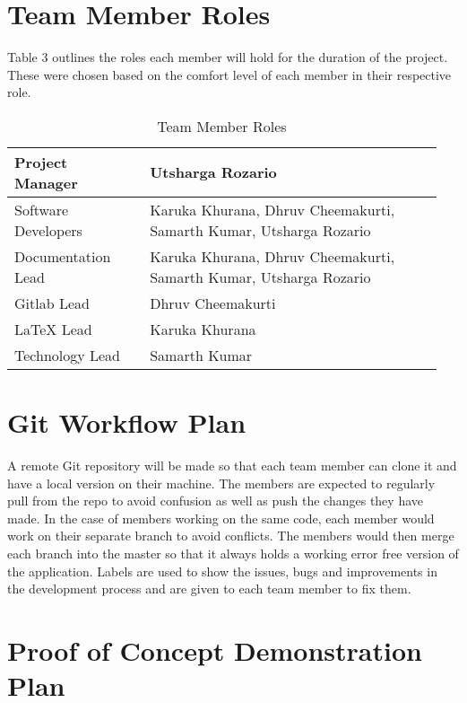 \documentclass[12pt, titlepage]{article}
\begin{document}
\section{Team Member Roles}
Table 3 outlines the roles each member will hold for the duration of the project. These were chosen based on the comfort level of each member in their respective role.  
\begin{table}[ht]
    \centering
    \begin{tabular}{| p{0.3\linewidth} | p{0.65\linewidth} |}
		\hline
Project Manager & Utsharga Rozario \\ \hline
Software Developers & Karuka Khurana, Dhruv Cheemakurti, Samarth Kumar, Utsharga Rozario \\ \hline
Documentation Lead & Karuka Khurana, Dhruv Cheemakurti, Samarth Kumar, Utsharga Rozario \\ \hline
Gitlab Lead & Dhruv Cheemakurti \\ \hline
LaTeX Lead & Karuka Khurana \\ \hline
Technology Lead & Samarth Kumar \\ \hline
    \end{tabular}
    \caption{Team Member Roles}
    \label{tab:my_label}
\end{table}

\newpage
\section{Git Workflow Plan}
A remote Git repository will be made so that each team member can clone it and have a local version on their machine. The members are expected to regularly pull from the repo to avoid confusion as well as push the changes they have made. In the case of members working on the same code, each member would work on their separate branch to avoid conflicts. The members would then merge each branch into the master so that it always holds a working error free version of the application. Labels are used to show the issues, bugs and improvements in the development process and are given to each team member to fix them. 

\section{Proof of Concept Demonstration Plan}
\end{document}
